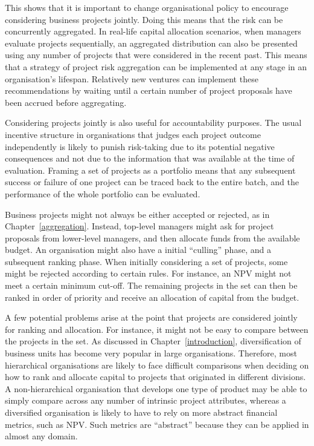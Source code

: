 \documentclass[a4paper, nobind, dvipsnames]{templates/ociamthesis}
\theoremstyle{definition}
\theoremstyle{definition}
\theoremstyle{definition}
\theoremstyle{definition}
\theoremstyle{remark}
\begin{document}
This shows that it is important to change organisational policy to encourage
considering business projects jointly. Doing this means that the risk can be
concurrently aggregated. In real-life capital allocation scenarios, when
managers evaluate projects sequentially, an aggregated distribution can also be
presented using any number of projects that were considered in the recent past.
This means that a strategy of project risk aggregation can be implemented at any
stage in an organisation's lifespan. Relatively new ventures can implement these
recommendations by waiting until a certain number of project proposals have been
accrued before aggregating.

Considering projects jointly is also useful for accountability purposes. The
usual incentive structure in organisations that judges each project outcome
independently is likely to punish risk-taking due to its potential negative
consequences and not due to the information that was available at the time of
evaluation. Framing a set of projects as a portfolio means that any subsequent
success or failure of one project can be traced back to the entire batch, and
the performance of the whole portfolio can be evaluated.

Business projects might not always be either accepted or rejected, as in
Chapter~\ref{aggregation}. Instead, top-level managers might ask for project
proposals from lower-level managers, and then allocate funds from the available
budget. An organisation might also have a initial ``culling'' phase, and a
subsequent ranking phase. When initially considering a set of projects, some
might be rejected according to certain rules. For instance, an NPV might not
meet a certain minimum cut-off. The remaining projects in the set can then be
ranked in order of priority and receive an allocation of capital from the
budget.

A few potential problems arise at the point that projects are considered jointly
for ranking and allocation. For instance, it might not be easy to compare
between the projects in the set. As discussed in Chapter~\ref{introduction},
diversification of business units has become very popular in large
organisations. Therefore, most hierarchical organisations are likely to face
difficult comparisons when deciding on how to rank and allocate capital to
projects that originated in different divisions. A non-hierarchical organisation
that develops one type of product may be able to simply compare across any
number of intrinsic project attributes, whereas a diversified organisation is
likely to have to rely on more abstract financial metrics, such as NPV. Such
metrics are ``abstract'' because they can be applied in almost any domain.
\end{document}
